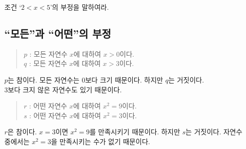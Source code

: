 \documentclass{oblivoir}
\begin{document}
%
\prob{}\label{negation10}
조건 `\(2<x<5\)’의 부정을 말하여라.


\newpage
%
\subsection{“모든”과 “어떤”의 부정}
\vspace{-20pt}
%
\begin{quote}\label{negation11}
\(p\) : 모든 자연수 \(x\)에 대하여 \(x>0\)이다.\footnotemark\\
\(q\) : 모든 자연수 \(x\)에 대하여 \(x>3\)이다.
\end{quote}
\(p\)는 참이다.
모든 자연수는 \(0\)보다 크기 때문이다.
하지만 \(q\)는 거짓이다.\\
\(3\)보다 크지 않은 자연수도 있기 때문이다.
\begin{quote}
\(r\) : 어떤 자연수 \(x\)에 대하여 \(x^2=9\)이다.\footnotemark\\
\(s\) : 어떤 자연수 \(x\)에 대하여 \(x^2=3\)이다.
\end{quote}
\(r\)은 참이다.
\(x=3\)이면 \(x^2=9\)를 만족시키기 때문이다.
하지만 \(s\)는 거짓이다.
자연수 중에서는 \(x^2=3\)을 만족시키는 수가 없기 때문이다.
\end{document}
